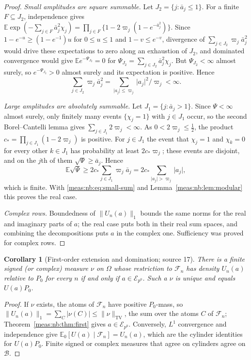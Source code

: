 \documentclass[11pt]{article}
\numberwithin{equation}{section}
\newtheorem{corollary}[theorem]{Corollary}
\theoremstyle{definition}
\theoremstyle{remark}
\newcommand{\B}{\mathcal B}
\newcommand{\E}{\mathbb E}
\newcommand{\TV}{\mathrm{TV}}
\newcommand{\norm}[1]{\lVert#1\rVert}
\newcommand{\abs}[1]{\lvert#1\rvert}
\newcommand{\Erow}{\mathcal E_{p^0}}
\begin{document}
\begin{proof}
\emph{Small amplitudes are square summable.} Let $J_2=\{j:\bar a_j\le1\}$. For a
finite $F\subseteq J_2$, independence gives
$\E\exp(-\sum_{j\in F}\bar a_j^2\chi_j)=\prod_{j\in F}\{1-2\varpi_j(1-e^{-\bar a_j^2})\}$.
Since $1-e^{-u}\ge(1-e^{-1})u$ for $0\le u\le1$ and $1-v\le e^{-v}$, divergence of
$\sum_{j\in J_2}\varpi_j\bar a_j^2$ would drive these expectations to zero along an
exhaustion of $J_2$, and dominated convergence would give $\E e^{-\Psi_{J_2}}=0$ for
$\Psi_{J_2}=\sum_{j\in J_2}\bar a_j^2\chi_j$. But $\Psi_{J_2}<\infty$ almost surely, so
$e^{-\Psi_{J_2}}>0$ almost surely and its expectation is positive. Hence
\begin{equation}\label{meas:nb:eq:small-sum}
 \sum_{j\in J_2}\varpi_j\bar a_j^2=\sum_{\abs{a_j}\le\varpi_j}\abs{a_j}^2/\varpi_j<\infty .
\end{equation}

\emph{Large amplitudes are absolutely summable.} Let $J_1=\{j:\bar a_j>1\}$. Since
$\Psi<\infty$ almost surely, only finitely many events $\{\chi_j=1\}$ with $j\in J_1$
occur, so the second Borel--Cantelli lemma gives $\sum_{j\in J_1}2\varpi_j<\infty$.
As $0<2\varpi_j\le\frac12$, the product $c_*=\prod_{j\in J_1}(1-2\varpi_j)$ is
positive. For $j\in J_1$ the event that $\chi_j=1$ and $\chi_k=0$ for every other
$k\in J_1$ has probability at least $2c_*\varpi_j$; these events are disjoint, and
on the $j$th of them $\sqrt\Psi\ge\bar a_j$. Hence
\[
 \E\sqrt\Psi\ge2c_*\sum_{j\in J_1}\varpi_j\bar a_j=2c_*\sum_{\abs{a_j}>\varpi_j}\abs{a_j},
\]
which is finite. With \eqref{meas:nb:eq:small-sum} and
Lemma~\ref{meas:nb:lem:modular} this proves the real case.

\emph{Complex rows.} Boundedness of $\norm{U_n(a)}_1$ bounds the same norms for the
real and imaginary parts of $a$; the real case puts both in their real sum spaces,
and combining the decompositions puts $a$ in the complex one. Sufficiency was
proved for complex rows.
\end{proof}

\begin{corollary}[First-order extension and domination; source 17]
\label{meas:nb:cor:firstmeasure}
There is a finite signed (or complex) measure $\nu$ on $\Omega$ whose restriction to
$\mathcal F_n$ has density $U_n(a)$ relative to $P_0$ for every $n$ if and only if
$a\in\Erow$. Such a $\nu$ is unique and equals $U(a)P_0$.
\end{corollary}
\begin{proof}
If $\nu$ exists, the atoms of $\mathcal F_n$ have positive $P_0$-mass, so
$\norm{U_n(a)}_1=\sum_{C}\abs{\nu(C)}\le\norm\nu_\TV$, the sum over the atoms $C$ of
$\mathcal F_n$; Theorem~\ref{meas:nb:thm:first} gives $a\in\Erow$. Conversely, $L^1$
convergence and independence give $\E_0[U(a)\mid\mathcal F_n]=U_n(a)$, which are the
cylinder identities for $U(a)P_0$. Finite signed or complex measures that agree on
cylinders agree on $\B$.
\end{proof}
\end{document}
